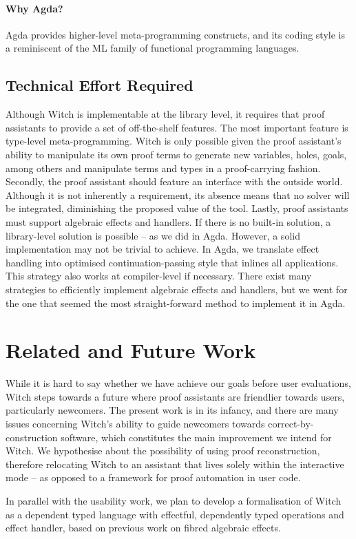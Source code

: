 \documentclass[sigconfl]{acmart}
\begin{document}
\paragraph{Why Agda?} Agda provides higher-level meta-programming constructs, and
its coding style is a reminiscent of the ML family of functional programming languages.

\subsection{Technical Effort Required} \label{tech-details}

Although Witch is implementable at the library level, it requires that proof
assistants to provide a set of off-the-shelf features. The most important
feature is type-level meta-programming. Witch is only possible given the proof
assistant's ability to manipulate its own proof terms to generate new variables,
holes, goals, among others and manipulate terms and types in a proof-carrying
fashion. Secondly, the proof assistant should feature an interface with the
outside world. Although it is not inherently a requirement, its absence means
that no solver will be integrated, diminishing the proposed value of the tool.
Lastly, proof assistants must support algebraic effects and handlers. If there
is no built-in solution, a library-level solution is possible -- as we did in
Agda. However, a solid implementation may not be trivial to achieve. In Agda,
we translate effect handling into optimised continuation-passing style that inlines
all applications. This strategy also works at compiler-level if necessary. There exist
many strategies to efficiently implement algebraic effects and handlers, but we
went for the one that seemed the most straight-forward method to implement it in Agda.

\section{Related and Future Work}

While it is hard to say whether we have achieve our goals before user
evaluations, Witch steps towards a future where proof assistants are
friendlier towards users, particularly newcomers. The present work is in its
infancy, and there are many issues concerning Witch's ability to guide newcomers
towards correct-by-construction software, which constitutes the main improvement
we intend for Witch. We hypothesise about the possibility of using proof
reconstruction, therefore relocating Witch to an assistant that lives solely
within the interactive mode -- as opposed to a framework for proof
automation in user code.

In parallel with the usability work, we plan to develop a formalisation of Witch
as a dependent typed language with effectful, dependently typed operations and
effect handler, based on previous work on fibred algebraic effects.
\end{document}
